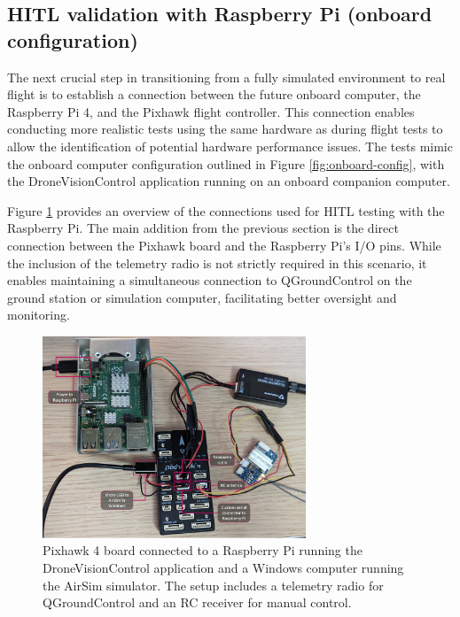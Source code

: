 \subsection{HITL validation with Raspberry Pi (onboard configuration)}
\label{sec:test-5-rpi}

The next crucial step in transitioning from a fully simulated environment to real flight is to establish a connection between the future onboard computer, the Raspberry Pi 4, and the Pixhawk flight controller. This connection enables conducting more realistic tests using the same hardware as during flight tests to allow the identification of potential hardware performance issues. The tests mimic the onboard computer configuration outlined in Figure \ref{fig:onboard-config}, with the DroneVisionControl application running on an onboard companion computer.

Figure \ref{fig:hitl-setup-picture} provides an overview of the connections used for HITL testing with the Raspberry Pi. The main addition from the previous section is the direct connection between the Pixhawk board and the Raspberry Pi's I/O pins. While the inclusion of the telemetry radio is not strictly required in this scenario, it enables maintaining a simultaneous connection to QGroundControl on the ground station or simulation computer, facilitating better oversight and monitoring.

\begin{figure}
  \centering
  \includegraphics[width=0.7\textwidth, keepaspectratio]{img/hitl-setup-picture.jpg}
  \caption{Pixhawk 4 board connected to a Raspberry Pi running the DroneVisionControl application and a Windows computer running the AirSim simulator. The setup includes a telemetry radio for QGroundControl and an RC receiver for manual control.}
  \label{fig:hitl-setup-picture}
\end{figure}

